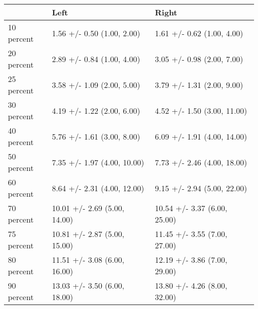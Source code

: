 \begin{tabular}{lll}
\toprule
{} &                          Left &                         Right \\
\midrule
10 percent &    1.56 +/- 0.50 (1.00, 2.00) &    1.61 +/- 0.62 (1.00, 4.00) \\
20 percent &    2.89 +/- 0.84 (1.00, 4.00) &    3.05 +/- 0.98 (2.00, 7.00) \\
25 percent &    3.58 +/- 1.09 (2.00, 5.00) &    3.79 +/- 1.31 (2.00, 9.00) \\
30 percent &    4.19 +/- 1.22 (2.00, 6.00) &   4.52 +/- 1.50 (3.00, 11.00) \\
40 percent &    5.76 +/- 1.61 (3.00, 8.00) &   6.09 +/- 1.91 (4.00, 14.00) \\
50 percent &   7.35 +/- 1.97 (4.00, 10.00) &   7.73 +/- 2.46 (4.00, 18.00) \\
60 percent &   8.64 +/- 2.31 (4.00, 12.00) &   9.15 +/- 2.94 (5.00, 22.00) \\
70 percent &  10.01 +/- 2.69 (5.00, 14.00) &  10.54 +/- 3.37 (6.00, 25.00) \\
75 percent &  10.81 +/- 2.87 (5.00, 15.00) &  11.45 +/- 3.55 (7.00, 27.00) \\
80 percent &  11.51 +/- 3.08 (6.00, 16.00) &  12.19 +/- 3.86 (7.00, 29.00) \\
90 percent &  13.03 +/- 3.50 (6.00, 18.00) &  13.80 +/- 4.26 (8.00, 32.00) \\
\bottomrule
\end{tabular}
